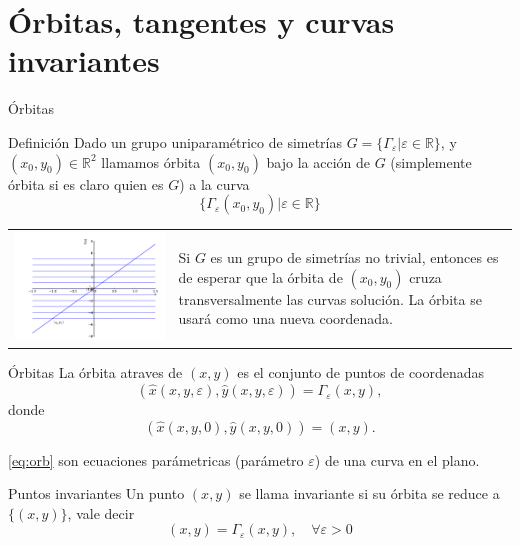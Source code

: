 \documentclass[handout,hyperref={colorlinks=true}]{beamer}
\newcommand{\rr}{\mathbb{R}}
\renewcommand{\emph}[1]{\textcolor[rgb]{1,0,0}{#1}}
\renewcommand{\epsilon}{\varepsilon}
\newcommand{\nl}{\onslide<+-> }
\begin{document}
\section[Órbitas]{Órbitas, tangentes y curvas invariantes}
\begin{frame}{Órbitas}

\nl\begin{block}{Definición}
Dado un grupo uniparamétrico de simetrías $G=\{\Gamma_{\epsilon}|\epsilon\in\rr\}$, y $(x_0,y_0)\in\rr^2$ llamamos \emph{órbita $(x_0,y_0)$ bajo la acción de  $G$} (simplemente órbita si es claro quien es $G$) a la curva
\[\{\Gamma_{\epsilon}(x_0,y_0)|\epsilon\in\rr\} \]
\end{block}

\nl 
\begin{tabular}{m{5cm} m{4cm}}
\includegraphics[scale=.3]{imagenes/sol_trivialB.png} &
Si $G$ es un grupo de simetrías no trivial, entonces es de esperar que la órbita de  $(x_0,y_0)$ cruza transversalmente las curvas solución. La órbita se usará como una nueva coordenada.   
\end{tabular}
\end{frame}
\begin{frame}{Órbitas}
\nl La órbita atraves de $(x,y)$ es el conjunto de puntos de coordenadas
\begin{equation}\label{eq:orb} (\hat{x}(x,y,\epsilon),\hat{y}(x,y,\epsilon))=\Gamma_{\epsilon}(x,y),
\end{equation}
donde
\[(\hat{x}(x,y,0),\hat{y}(x,y,0))=(x,y).\]

\eqref{eq:orb} son ecuaciones parámetricas (parámetro $\epsilon$) de una  curva en el plano.

\nl \begin{block}{Puntos invariantes}
Un punto $(x,y)$ se llama invariante si su órbita se reduce a $\{(x,y)\}$, vale decir
\[(x,y)=\Gamma_{\epsilon}(x,y),\quad\forall \epsilon>0\]

\end{block}


\end{frame}
\end{document}

